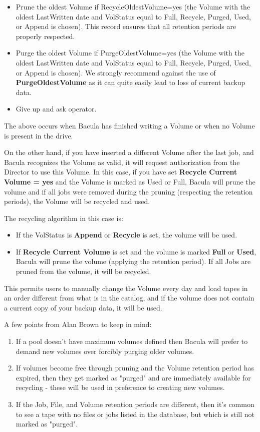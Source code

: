 \begin{itemize}
\item Prune the oldest Volume if RecycleOldestVolume=yes (the Volume with the
   oldest LastWritten date and VolStatus equal to  Full, Recycle, Purged, Used,
   or Append is chosen). This  record ensures that all retention periods are
   properly respected. 
\item Purge the oldest Volume if PurgeOldestVolume=yes (the Volume  with the
   oldest LastWritten date and VolStatus equal to  Full, Recycle, Purged, Used,
   or Append is chosen). We strongly  recommend against the use of {\bf
   PurgeOldestVolume} as it can quite easily lead to loss of current backup
   data. 
\item Give up and ask operator. 
\end{itemize}

The above occurs when Bacula has finished writing a Volume or when no Volume
is present in the drive. 

On the other hand, if you have inserted a different Volume after the last job,
and Bacula recognizes the Volume as valid, it will request authorization from
the Director to use this Volume. In this case, if you have set {\bf Recycle
Current Volume = yes} and the Volume is marked as Used or Full, Bacula will
prune the volume and if all jobs were removed during the pruning (respecting
the retention periods), the Volume will be recycled and used. 

The recycling algorithm in this case is: 
\begin{itemize}
\item If the VolStatus is {\bf Append} or {\bf Recycle} 
   is set, the volume  will be used.  
\item If {\bf Recycle Current Volume} is set and the  volume is marked {\bf
   Full} or {\bf Used}, Bacula  will prune the volume (applying the retention
   period).  If all Jobs are pruned from the volume, it will be  recycled. 
\end{itemize}

This permits users to manually change the Volume every day and load tapes in
an order different from what is in the catalog, and if the volume does not
contain a current copy of your backup data, it will be used. 

A few points from Alan Brown to keep in mind:

\begin{enumerate}
\item If a pool doesn't have maximum volumes defined then Bacula will prefer to 
  demand new volumes over forcibly purging older volumes.

\item If volumes become free through pruning and the Volume retention period has
  expired, then they get marked as "purged" and are immediately available for
  recycling - these will be used in preference to creating new volumes.

\item If the Job, File, and Volume retention periods are different, then
  it's common to see a tape with no files or jobs listed in the database,
  but which is still not marked as "purged".
\end{enumerate}


